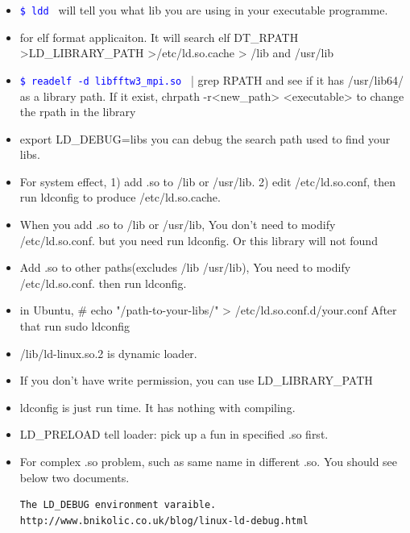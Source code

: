 \documentclass[a4paper,11pt,twoside]{book}
\newcommand{\linuxcommand}[1]{\texttt{\textcolor{blue}{\$ #1 \Pisymbol{psy}{191}}}}
\begin{document}
		\begin{itemize}
  		 \item \linuxcommand{ldd} will tell you what lib you are using in your executable programme.

				\item for elf format applicaiton. It will search elf DT\_RPATH >LD\_LIBRARY\_PATH >/etc/ld.so.cache > /lib and /usr/lib

				\item \linuxcommand{readelf -d libfftw3\_mpi.so} | grep RPATH and see if it has /usr/lib64/ as a library path. If it exist, chrpath -r<new\_path> <executable> to change the rpath in the library 

				\item export LD\_DEBUG=libs you can debug the search path used to find your libs.

				\item For system effect, 1) add .so to /lib or /usr/lib. 2) edit /etc/ld.so.conf, then run ldconfig to produce /etc/ld.so.cache.

				\item When you add .so to /lib or /usr/lib, You don't need to modify /etc/ld.so.conf. but you need run ldconfig.  Or this library will not found 

				\item Add .so to other paths(excludes /lib /usr/lib), You need to modify /etc/ld.so.conf. then run ldconfig. 
				
				\item in Ubuntu, \# echo "/path-to-your-libs/" > /etc/ld.so.conf.d/your.conf After that run sudo ldconfig
						
				\item /lib/ld-linux.so.2 is dynamic loader. 

				\item If you don't have write permission, you can use LD\_LIBRARY\_PATH

				\item ldconfig is just run time. It has nothing with compiling. 

				\item LD\_PRELOAD tell loader: pick up a fun in specified .so first. 

				\item For complex .so problem, such as same name in different .so.  You should see below two documents. 

\begin{verbatim}
The LD_DEBUG environment varaible.
http://www.bnikolic.co.uk/blog/linux-ld-debug.html	


\end{verbatim}
\end{itemize}
\end{document}
